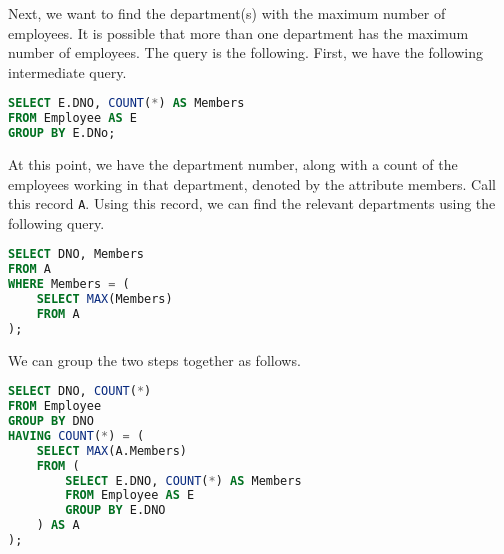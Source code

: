 \documentclass[a4paper, openany]{memoir}
\begin{document}
Next, we want to find the department(s) with the maximum number of employees. It is possible that more than one department has the maximum number of employees. The query is the following. First, we have the following intermediate query.
\begin{lstlisting}[language=SQL]
SELECT E.DNO, COUNT(*) AS Members
FROM Employee AS E
GROUP BY E.DNo;
\end{lstlisting}
At this point, we have the department number, along with a count of the employees working in that department, denoted by the attribute members. Call this record \texttt{A}. Using this record, we can find the relevant departments using the following query.
\begin{lstlisting}[language=SQL]
SELECT DNO, Members
FROM A
WHERE Members = (
    SELECT MAX(Members)
    FROM A
);
\end{lstlisting}
We can group the two steps together as follows.
\begin{lstlisting}[language=SQL]
SELECT DNO, COUNT(*)
FROM Employee
GROUP BY DNO
HAVING COUNT(*) = (
    SELECT MAX(A.Members)
    FROM (
        SELECT E.DNO, COUNT(*) AS Members
        FROM Employee AS E
        GROUP BY E.DNO
    ) AS A
);
\end{lstlisting}


\end{document}
